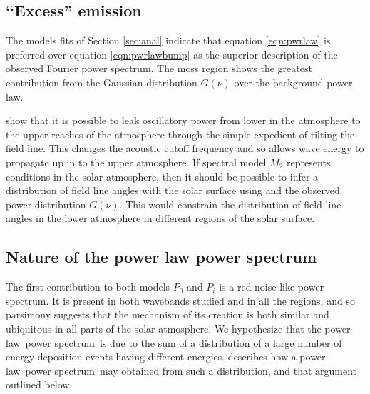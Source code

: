 \documentclass[preprint2]{aastex}
\newcommand{\PS}{power spectrum}
\newcommand{\PL}{power-law}
\begin{document}
\subsection{``Excess'' emission}\label{ssec:excess}
The models fits of Section \ref{sec:anal} indicate that equation
\ref{eqn:pwrlaw} is preferred over equation \ref{eqn:pwrlawbump} as
the superior description of the observed Fourier power spectrum. The
moss region shows the greatest contribution from the Gaussian
distribution $G(\nu)$ over the background power law.  

\cite{2005ApJ...624L..61D} show that it is possible to leak
oscillatory power from lower in the atmosphere to the upper reaches of
the atmosphere through the simple expedient of tilting the field line.
This changes the acoustic cutoff frequency and so allows wave energy
to propagate up in to the upper atmosphere.  If spectral model $M_{2}$
represents conditions in the solar atmosphere, then it should be
possible to infer a distribution of field line angles with the solar
surface using \cite{2005ApJ...624L..61D} and the observed power
distribution $G(\nu)$.  This would constrain the distribution of field
line angles in the lower atmosphere in different regions of the solar
surface. 


\subsection{Nature of the power law power spectrum}\label{ssec:nplps}
The first contribution to both models $P_{0}$ and $P_{i}$ is a
red-noise like power spectrum.  It is present in both wavebands
studied and in all the regions, and so parsimony suggests that the
mechanism of its creation is both similar and ubiquitous in all parts
of the solar atmosphere.  We hypothesize that the \PL\ \PS\ is due to
the sum of a distribution of a large number of energy deposition
events having different energies. \cite{2011soca.book.....A} describes
how a \PL\ \PS\ may obtained from such a distribution, and that
argument outlined below.
\end{document}
